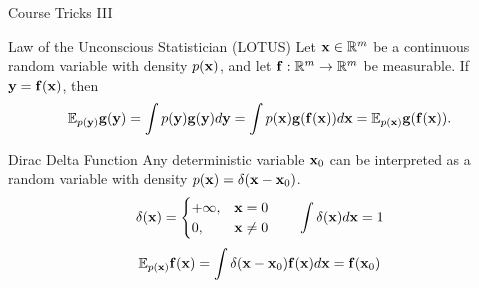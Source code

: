\documentclass{beamer}
\begin{document}
\begin{frame}{Course Tricks III}
	\begin{block}{Law of the Unconscious Statistician (LOTUS)}
		Let $\mathbf{x} \in \mathbb{R}^m$ be a continuous random variable with density $p(\mathbf{x})$, and let $\mathbf{f}: \mathbb{R}^m \to \mathbb{R}^m$ be measurable. If $\mathbf{y} = \mathbf{f}(\mathbf{x})$, then
		$$
			\mathbb{E}_{p(\mathbf{y})} \mathbf{g}(\mathbf{y}) = \int p(\mathbf{y}) \mathbf{g}(\mathbf{y}) d\mathbf{y} = \int p(\mathbf{x}) \mathbf{g}(\mathbf{f}(\mathbf{x})) d\mathbf{x} = \mathbb{E}_{p(\mathbf{x})} \mathbf{g}(\mathbf{f}(\mathbf{x})).
		$$
		\vspace{-0.4cm}
	\end{block}
	\begin{block}{Dirac Delta Function}
		Any deterministic variable $\mathbf{x}_0$ can be interpreted as a random variable with density $p(\mathbf{x}) = \delta(\mathbf{x} - \mathbf{x}_0)$. 
		\vspace{-0.3cm}
		$$
			\delta(\mathbf{x}) = 
			\begin{cases}
				+\infty, & \mathbf{x} = 0 \\
				0, & \mathbf{x} \neq 0
			\end{cases} \qquad 
			\int \delta(\mathbf{x}) d\mathbf{x} = 1
		$$
		$$
			\mathbb{E}_{p(\mathbf{x})}\mathbf{f}(\mathbf{x}) = \int \delta (\mathbf{x} - \mathbf{x}_0) \mathbf{f}(\mathbf{x}) d\mathbf{x} = \mathbf{f}(\mathbf{x}_0)
		$$
	\end{block}
\end{frame}
\end{document}

